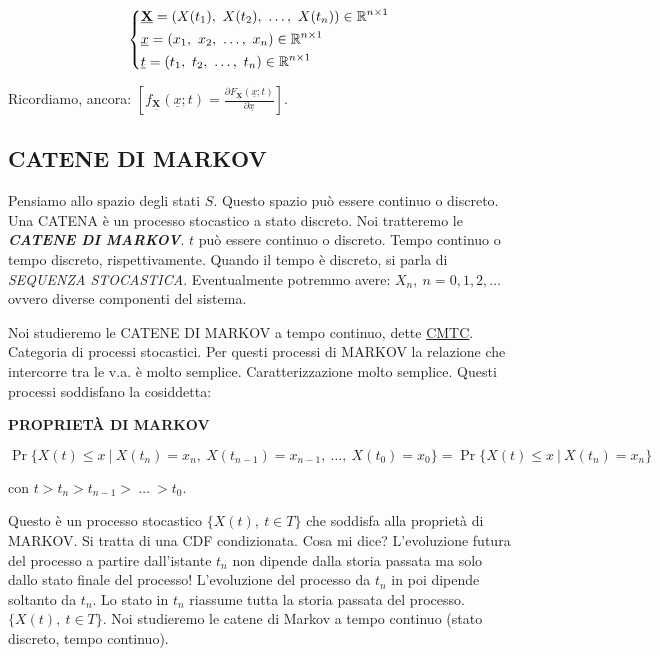 \[
	\left\{
	\begin{aligned}
	&\mathbf{\underline{X}} = (X(t_1),\ X(t_2),\ \dots,\ X(t_n)) \in\mathbb{R}^{n\times 1}  \\
	&\underline{x} = (x_1,\ x_2,\ \dots,\ x_n) \in\mathbb{R}^{n\times 1}\\
	&\underline{t} = (t_1,\ t_2,\ \dots,\ t_n) \in\mathbb{R}^{n\times 1}
	\end{aligned}
	\right.
\]

Ricordiamo, ancora: $[f_{\mathbf{\underline{X}}}(\underline{x}; t) = \frac{\partial{F_{\mathbf{\underline{X}}}(\underline{x}; t)}}{\partial{\underline{x}}}]$.

\subsection{CATENE DI MARKOV}

Pensiamo allo spazio degli stati $S$. Questo spazio può essere continuo o discreto. Una CATENA è un processo stocastico a stato discreto. Noi tratteremo le \textit{\textbf{CATENE DI MARKOV}}. $t$ può essere continuo o discreto. Tempo continuo o tempo discreto, rispettivamente. Quando il tempo è discreto, si parla di \textit{SEQUENZA STOCASTICA}. Eventualmente potremmo avere: $X_n,\ n=0,1,2,\dots$ ovvero diverse componenti del sistema.

Noi studieremo le CATENE DI MARKOV a tempo continuo, dette \underline{CMTC}. Categoria di processi stocastici. Per questi processi di MARKOV la relazione che intercorre tra le v.a. è molto semplice. Caratterizzazione molto semplice. Questi processi soddisfano la cosiddetta:

\begin{defn}{\textbf{PROPRIET\`A DI MARKOV}}

\[
	\Pr\{X(t) \leq x\ |\ X(t_n) = x_n,\ X(t_{n-1}) = x_{n-1},\ \dots,\ X(t_0) = x_0\} = \Pr\{X(t) \leq x\ |\ X(t_n) = x_n\}
\]

con $t > t_n > t_{n-1} >\ \dots\ > t_0$. 
\end{defn}

Questo è un processo stocastico $\{X(t),\ t\in T\}$ che soddisfa alla proprietà di MARKOV. Si tratta di una CDF condizionata. Cosa mi dice? L'evoluzione futura del processo a partire dall'istante $t_n$ non dipende dalla storia passata ma solo dallo stato finale del processo! L'evoluzione del processo da $t_n$ in poi dipende soltanto da $t_n$. Lo stato in $t_n$ riassume tutta la storia passata del processo. $\{X(t),\ t\in T\}$. Noi studieremo le catene di Markov a tempo continuo (stato discreto, tempo continuo). 

